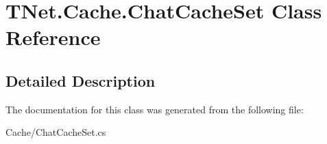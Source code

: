 \hypertarget{class_t_net_1_1_cache_1_1_chat_cache_set}{}\section{T\+Net.\+Cache.\+Chat\+Cache\+Set Class Reference}
\label{class_t_net_1_1_cache_1_1_chat_cache_set}


 




\subsection{Detailed Description}




The documentation for this class was generated from the following file\+:\begin{DoxyCompactItemize}
\item 
Cache/Chat\+Cache\+Set.\+cs\end{DoxyCompactItemize}
